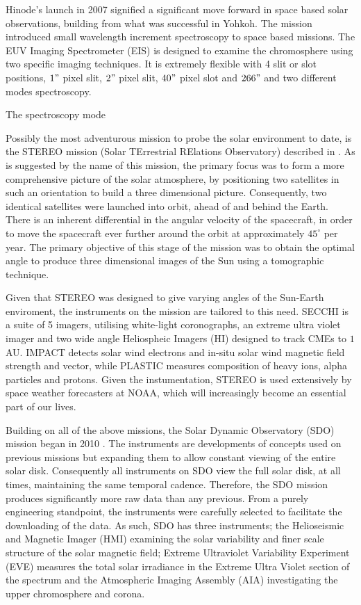 Hinode's launch in 2007 signified a significant move forward in space based solar observations, building from what was successful in Yohkoh.
The mission introduced small wavelength increment spectroscopy to space based missions.
The EUV Imaging Spectrometer (EIS) is designed to examine the chromosphere using two specific imaging techniques.
It is extremely flexible with 4 slit or slot positions, $1"$ pixel slit, $2"$ pixel slit, $40"$ pixel slot and $266"$ and two different modes spectroscopy.

The spectroscopy mode 


Possibly the most adventurous mission to probe the solar environment to date, is the STEREO mission (Solar TErrestrial RElations Observatory) described in \cite{Kaiser2008}.
As is suggested by the name of this mission, the primary focus was to form a more comprehensive picture of the solar atmosphere, by positioning two satellites in such an orientation to build a three dimensional picture.
Consequently, two identical satellites were launched into orbit, ahead of and behind the Earth.
There is an inherent differential in the angular velocity of the spacecraft, in order to move the spacecraft ever further around the orbit at approximately $45^\circ$ per year.
The primary objective of this stage of the mission was to obtain the optimal angle to produce three dimensional images of the Sun using a tomographic technique.

Given that STEREO was designed to give varying angles of the Sun-Earth  enviroment, the instruments on the mission are tailored to this need.
SECCHI is a suite of 5 imagers, utilising white-light coronographs, an extreme ultra violet imager and two wide angle Heliospheic Imagers (HI) designed to track CMEs to $1$ AU.
IMPACT detects solar wind electrons and in-situ solar wind magnetic field strength and vector, while PLASTIC measures composition of heavy ions, alpha particles and protons. 
Given the instumentation, STEREO is used extensively by space weather forecasters at NOAA, which will increasingly become an essential part of our lives.

Building on all of the above missions, the Solar Dynamic Observatory (SDO) mission began in 2010 \cite{Kaiser2008}.
The instruments are developments of concepts used on previous missions but expanding them to allow constant viewing of the entire solar disk.
Consequently all instruments on SDO view the full solar disk, at all times, maintaining the same temporal cadence. 
Therefore, the SDO mission produces significantly more raw data than any previous.
From a purely engineering standpoint, the instruments were carefully selected to facilitate the downloading of the data.
As such, SDO has three instruments; the Helioseismic and Magnetic Imager (HMI) examining the solar variability and finer scale structure of the solar magnetic field; Extreme Ultraviolet Variability Experiment (EVE) measures the total solar irradiance in the Extreme Ultra Violet section of the spectrum and the Atmospheric Imaging Assembly (AIA) investigating the upper chromosphere and corona.

